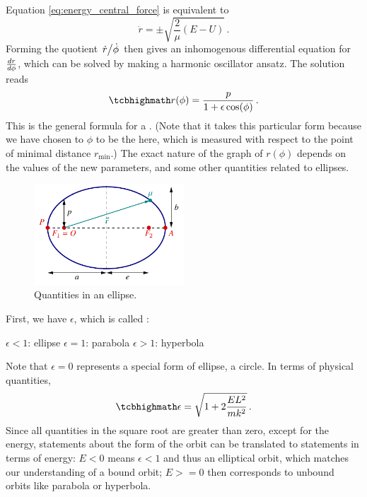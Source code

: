 \documentclass[../class_mech_main.tex]{subfiles}
\begin{document}
Equation \eqref{eq:energy_central_force} is equivalent to
\begin{equation}
	\dot{r} = \pm \sqrt{\frac{2}{\mu} (E - U)}
	\, .
\end{equation}
Forming the quotient $\flatfrac{\dot{{r}}}{\dot{\phi}}$ then gives an inhomogenous differential equation for $\dv{r}{\phi}$, which can be solved by making a harmonic oscillator ansatz. The solution reads
\begin{equation}\label{eq:central_force_r_of_phi}
	\eqbox{
		r(\phi) = \frac{p}{1 + \epsilon \cos(\phi)}
	} \, .
\end{equation}
This is the general formula for a . (Note that it takes this particular form because we have chosen to $\phi$ to be the  here, which is measured with respect to the point of minimal distance $r_\mathrm{min}$.) The exact nature of the graph of $r(\phi)$ depends on the values of the new parameters, and some other quantities related to ellipses.



\begin{figure}
	\centering

	\includegraphics[width=0.5\textwidth]{pictures/central_force_ellipse.pdf}

	\caption{Quantities in an ellipse.}
	\label{fig:central_force_ellipse}
\end{figure}



First, we have $\epsilon$, which is called :
\begin{center}
	$\epsilon < 1$: ellipse
	\qquad
	$\epsilon = 1$: parabola
	\qquad
	$\epsilon > 1$: hyperbola
\end{center}
Note that $\epsilon = 0$ represents a special form of ellipse, a circle. In terms of physical quantities,
\begin{equation}
	\eqbox{
		\epsilon = \sqrt{1 + 2 \frac{E L^2}{m k^2}}
	} \, .
\end{equation}
Since all quantities in the square root are greater than zero, except for the energy, statements about the form of the orbit can be translated to statements in terms of energy: $E < 0$ means $\epsilon < 1$ and thus an elliptical orbit, which matches our understanding of a bound orbit; $E >= 0$ then corresponds to unbound orbits like parabola or hyperbola.
\end{document}
